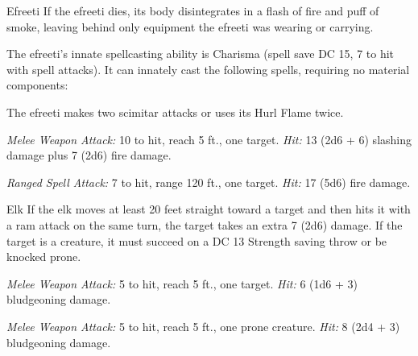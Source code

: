 \documentclass[10pt,a4paper,twoside,bg=print,twocolumn,openany,nodeprecatedcode]{dndbook}
\begin{document}
\begin{DndMonster}[float=t]{Efreeti}
\DndMonsterBasics[
armor-class = {17 (natural armor)},
hit-points = {\DndDice{16d10 + 112}},
speed = {40 ft., fly 60 ft.}
]
\DndMonsterAbilityScores[
 str = 22,
 dex = 12,
 con = 24,
 int = 16,
 wis = 15,
 cha = 16
]
\DndMonsterDetails[
saving-throws = {Int +7, Wis +6, Cha +7},
damage-immunities = {fire},
senses = {darkvision 120 ft., passive perception 12},
languages = {Ignan},
challenge = 11,
]
If the efreeti dies, its body disintegrates in a flash of fire and puff of smoke, leaving behind only equipment the efreeti was wearing or carrying.

The efreeti's innate spellcasting ability is Charisma (spell save DC 15, 7 to hit with spell attacks). It can innately cast the following spells, requiring no material components:
\begin{DndMonsterSpells}
\end{DndMonsterSpells}
The efreeti makes two scimitar attacks or uses its Hurl Flame twice.

\textsl{Melee Weapon Attack:} 10 to hit, reach 5 ft., one target. \textsl{Hit:} 13 (2d6 + 6) slashing damage plus 7 (2d6) fire damage.

\textsl{Ranged Spell Attack:} 7 to hit, range 120 ft., one target. \textsl{Hit:} 17 (5d6) fire damage.

\end{DndMonster}



\begin{DndMonster}[float=t]{Elk}
\DndMonsterBasics[
armor-class = {10},
hit-points = {\DndDice{2d10 + 2}},
speed = {50 ft.}
]
\DndMonsterAbilityScores[
 str = 16,
 dex = 10,
 con = 12,
 int = 2,
 wis = 10,
 cha = 6
]
\DndMonsterDetails[
challenge = 1/4,
]
If the elk moves at least 20 feet straight toward a target and then hits it with a ram attack on the same turn, the target takes an extra 7 (2d6) damage. If the target is a creature, it must succeed on a DC 13 Strength saving throw or be knocked prone.

\textsl{Melee Weapon Attack:} 5 to hit, reach 5 ft., one target. \textsl{Hit:} 6 (1d6 + 3) bludgeoning damage.

\textsl{Melee Weapon Attack:} 5 to hit, reach 5 ft., one prone creature. \textsl{Hit:} 8 (2d4 + 3) bludgeoning damage.

\end{DndMonster}
\end{document}
